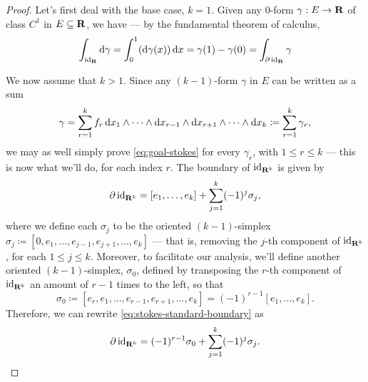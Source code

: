 \begin{proof}
    Let's first deal with the base case, \(k = 1\). Given any \(0\)-form \(\gamma: E
    \to \mathbf{R}\) of class \(C^1\) in \(E \subseteq \mathbf{R}\), we have --- by the fundamental
    theorem of calculus,
    \[
        \int_{\operatorname{id}_{\mathbf{R}}} \mathrm{d} \gamma
        = \int_0^1 (\mathrm{d} \gamma(x))\, \mathrm{d} x
        = \gamma(1) - \gamma(0)
        = \int_{\partial \operatorname{id}_{\mathbf{R}}} \gamma
    \]

    We now assume that \(k > 1\). Since any \((k-1)\)-form \(\gamma\) in \(E\) can
    be written as a sum
    \[
        \gamma =
        \sum_{r=1}^k f_r\, \mathrm{d} x_1 \wedge \dots \wedge \mathrm{d} x_{r-1} \wedge
        \mathrm{d} x_{r+1} \wedge \dots \wedge \mathrm{d} x_k
        \coloneq \sum_{r=1}^k \gamma_r,
    \]
    we may as well simply prove \cref{eq:goal-stokes} for every \(\gamma_r\), with
    \(1 \leq r \leq k\) --- this is now what we'll do, for each index \(r\). The
    boundary of \(\operatorname{id}_{\mathbf{R}^k}\) is given by
    \begin{equation}
        \label{eq:stokes-standard-boundary}
        \partial \operatorname{id}_{\mathbf{R}^k} = [e_1, \dots, e_k] + \sum_{j=1}^k (-1)^j \sigma_j,
    \end{equation}
    where we define each \(\sigma_j\) to be the oriented \((k-1)\)-simplex
    \(\sigma_j \coloneq [0, e_1, \dots, e_{j-1}, e_{j+1}, \dots, e_k]\) --- that is,
    removing the \(j\)-th component of \(\operatorname{id}_{\mathbf{R}^k}\), for each \(1 \leq j \leq
    k\). Moreover, to facilitate our analysis, we'll define another oriented
    \((k-1)\)-simplex, \(\sigma_0\), defined by transposing the \(r\)-th component of
    \(\operatorname{id}_{\mathbf{R}^k}\) an amount of \(r-1\) times to the left, so that
    \[
        \sigma_0 \coloneq [e_r, e_1, \dots, e_{r-1}, e_{r+1}, \dots, e_k]
        = (-1)^{r-1} [e_1, \dots, e_k].
    \]
    Therefore, we can rewrite \cref{eq:stokes-standard-boundary} as
    \[
        \partial \operatorname{id}_{\mathbf{R}^k}
        = (-1)^{r-1} \sigma_0 + \sum_{j=1}^k (-1)^{j} \sigma_j.
    \]


\end{proof}
